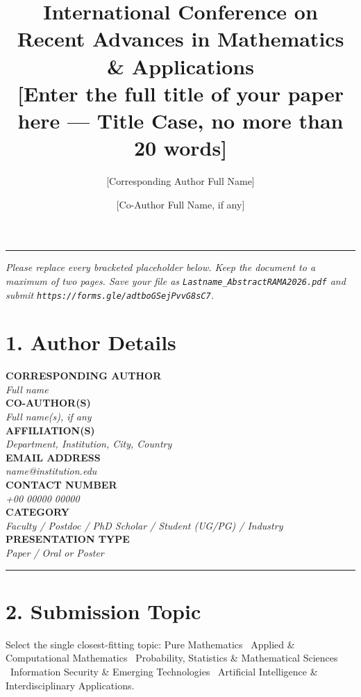 \documentclass[11pt,a4paper]{article}
\title{\color{ramabrass}\normalsize International Conference on\\[4pt]
       \color{ramaink}\Huge\bfseries Recent Advances in Mathematics \& Applications\\[10pt]
       \normalsize\normalfont\color{black}[Enter the full title of your paper here --- Title Case, no more than 20 words]}
\author[1]{[Corresponding Author Full Name]}
\author[2]{[Co-Author Full Name, if any]}
\affil[1]{[Department, Institution, City, Country]}
\affil[2]{[Department, Institution, City, Country]}
\date{}
\newcommand{\fieldlabel}[1]{\textbf{\small\color{ramabrass}\MakeUppercase{#1}}\\}
\newcommand{\placeholder}[1]{\textit{\color{gray}#1}}
\begin{document}
\maketitle
\thispagestyle{fancy}

\vspace{-1.2cm}
\noindent\rule{\linewidth}{0.6pt}

\vspace{0.3cm}
\noindent\textit{\small\color{ramasoft}
Please replace every bracketed placeholder below. Keep the document to a
maximum of two pages. Save your file as
\texttt{Lastname\_AbstractRAMA2026.pdf} and submit \texttt{https://forms.gle/adtboGSejPvvG8sC7}.}

\vspace{0.4cm}

\section*{1. \; Author Details}

\fieldlabel{Corresponding Author} \placeholder{Full name} \\[6pt]
\fieldlabel{Co-Author(s)} \placeholder{Full name(s), if any} \\[6pt]
\fieldlabel{Affiliation(s)} \placeholder{Department, Institution, City, Country} \\[6pt]
\fieldlabel{Email Address} \placeholder{name@institution.edu} \\[6pt]
\fieldlabel{Contact Number} \placeholder{+00 00000 00000} \\[6pt]
\fieldlabel{Category} \placeholder{Faculty / Postdoc / PhD Scholar / Student (UG/PG) / Industry} \\[6pt]
\fieldlabel{Presentation Type} \placeholder{Paper / Oral or Poster}

\vspace{0.3cm}
\noindent\rule{\linewidth}{0.4pt}

\section*{2. \; Submission Topic}

\noindent\small\color{ramasoft}
Select the single closest-fitting topic: Pure Mathematics
\textperiodcentered\ Applied \& Computational Mathematics
\textperiodcentered\ Probability, Statistics \& Mathematical Sciences
\textperiodcentered\ Information Security \& Emerging Technologies
\textperiodcentered\ Artificial Intelligence \& Interdisciplinary
Applications.
\normalcolor\normalsize
\end{document}
